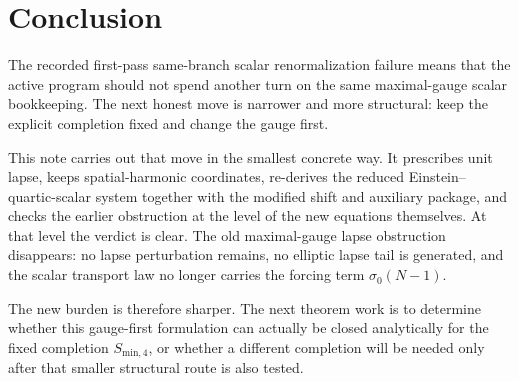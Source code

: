 \documentclass[11pt]{article}
\begin{document}
\section{Conclusion}

The recorded first-pass same-branch scalar renormalization failure means that the active program should not spend another turn on the same maximal-gauge scalar bookkeeping. The next honest move is narrower and more structural: keep the explicit completion fixed and change the gauge first.

This note carries out that move in the smallest concrete way. It prescribes unit lapse, keeps spatial-harmonic coordinates, re-derives the reduced Einstein--quartic-scalar system together with the modified shift and auxiliary package, and checks the earlier obstruction at the level of the new equations themselves. At that level the verdict is clear. The old maximal-gauge lapse obstruction disappears: no lapse perturbation remains, no elliptic lapse tail is generated, and the scalar transport law no longer carries the forcing term \(\sigma_0(N-1)\).

The new burden is therefore sharper. The next theorem work is to determine whether this gauge-first formulation can actually be closed analytically for the fixed completion \(S_{\mathrm{min},4}\), or whether a different completion will be needed only after that smaller structural route is also tested.
\end{document}
